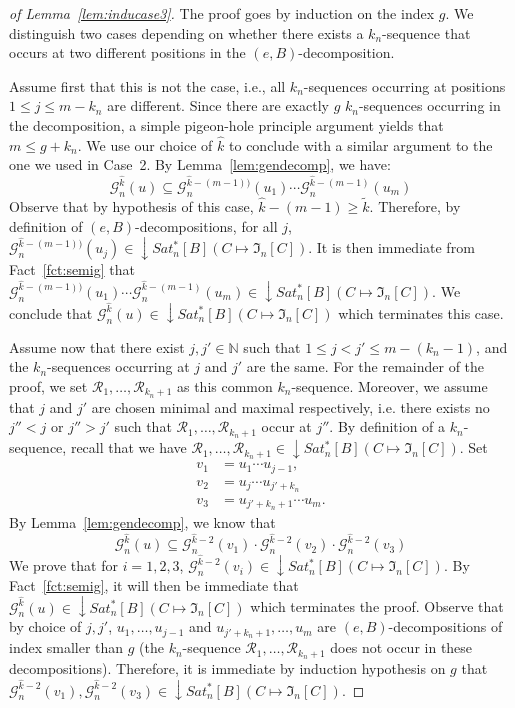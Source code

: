 \documentclass[envcountsame]{llncs}
\newcommand\nat{\ensuremath{\mathbb{N}}\xspace}
\newcommand\Gs{\ensuremath{\mathcal{G}}\xspace}
\newcommand\Rs{\ensuremath{\mathcal{R}}\xspace}
\let\leq\leqslant
\let\geq\geqslant
\newcommand\fI{\ensuremath{\mathfrak I}\xspace}
\DeclareMathOperator{\downclos}{\downarrow}
\begin{document}
\begin{proof}[of Lemma~\ref{lem:inducase3}]
  The proof goes by induction on the index $g$. We distinguish two cases
  depending on whether there exists a $k_n$-sequence that occurs at two
  different positions in the $(e,B)$-decomposition.

  Assume first that this is not the case, i.e., all $k_n$-sequences occurring at
  positions $1 \leq j \leq m - k_n$ are different. Since there are exactly $g$
  $k_n$-sequences occurring in the decomposition, a simple pigeon-hole
  principle argument yields that $m \leq g + k_n$. We use our choice of
  $\widehat{k}$ to conclude with a similar argument to the one we used in
  Case~2. By Lemma~\ref{lem:gendecomp}, we have: 
  \[
  \Gs_n^{\widehat{k}}(u) \subseteq
  \Gs_n^{\widehat{k}-(m-1))}(u_1) \cdots
  \Gs_n^{\widehat{k}-(m-1)}(u_m) 
  \]
  Observe that by hypothesis of this case, $\widehat{k} - (m-1) \geq 
  \widetilde{k}$. Therefore, by definition of $(e,B)$-decompositions,
  for all $j$, $\Gs_n^{\widehat{k}-(m-1))}(u_j) \in \downclos
  Sat^{*}_n[B](C \mapsto \fI_n[C])$. It is then immediate from
  Fact~\ref{fct:semig} that $\Gs_n^{\widehat{k}-(m-1))}(u_1) \cdots
  \Gs_n^{\widehat{k}-(m-1)}(u_m) \in \downclos
  Sat^{*}_n[B](C \mapsto \fI_n[C])$. We conclude that
  $\Gs_n^{\widehat{k}}(u) \in \downclos
  Sat^{*}_n[B](C \mapsto \fI_n[C])$ which terminates this case.



  \medskip
  Assume now that there exist $j,j' \in \nat$ such that $1 \leq j<j'
  \leq m - (k_n-1)$, and the
  $k_n$-sequences occurring at $j$ and $j'$ are the same. For the
  remainder of the proof, we set $\Rs_1,\dots,\Rs_{k_n+1}$ as this
  common $k_n$-sequence. Moreover, we assume that $j$ and $j'$ are
  chosen minimal and maximal respectively, i.e. there exists no
  $j'' < j$ or $j'' > j'$ such that $\Rs_1,\dots,\Rs_{k_n+1}$ occur
  at $j''$. By definition of a $k_n$-sequence, recall that we have
  $\Rs_1,\dots,\Rs_{k_n+1} \in \downclos Sat^{*}_n[B](C \mapsto
  \fI_n[C])$. Set
  \begin{align*}
    v_1 &= u_1 \cdots u_{j-1},\\
    v_2 &= u_{j} \cdots u_{j'+k_n}\\
    v_3 &= u_{j'+k_n+1} \cdots u_{m}.
  \end{align*}
  By Lemma~\ref{lem:gendecomp}, we know that
  \[
  \Gs_n^{\widehat{k}}(u) \subseteq
  \Gs_n^{\widehat{k}-2}(v_1) \cdot
  \Gs_n^{\widehat{k}-2}(v_2) \cdot
  \Gs_n^{\widehat{k}-2}(v_3) 
  \]
  We prove that for $i=1,2,3$, $\Gs_n^{\widehat{k}-2}(v_i) \in \downclos
  Sat^{*}_n[B](C \mapsto \fI_n[C])$. By Fact~\ref{fct:semig}, it will
  then be immediate that $\Gs_n^{\widehat{k}}(u) \in \downclos
  Sat^{*}_n[B](C \mapsto \fI_n[C])$ which terminates the proof. Observe
  that by choice of $j,j'$, $u_1,\dots,u_{j-1}$ and $u_{j'+k_n+1},\dots,
  u_{m}$ are $(e,B)$-decompositions of index smaller than $g$ (the
  $k_n$-sequence $\Rs_1,\dots,\Rs_{k_n+1}$ does not occur in these
  decompositions). Therefore, it is immediate by induction hypothesis on
  $g$ that $\Gs_n^{\widehat{k}-2}(v_1), \Gs_n^{\widehat{k}-2}(v_3) \in \downclos
  Sat^{*}_n[B](C \mapsto \fI_n[C])$.


\end{proof}
\end{document}
